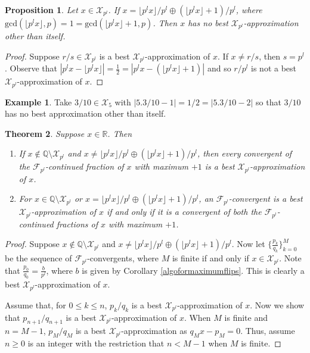 \documentclass[12pt]{elsarticle}
\newtheorem{theorem}{Theorem}[section]
\newtheorem{proposition}[theorem]{Proposition}
\theoremstyle{definition}
\newtheorem{example}{Example}
\newcommand{\field}[1]{\mathbb{#1}}          \newcommand{\Q}{\field{Q}}
\newcommand{\R}{\field{R}}                   \newcommand{\Z}{\field{Z}}
\newcommand{\mX}{{\mathcal X}}
\newcommand{\f}{{\mathcal F}}
\begin{document}
{  	\begin{proposition}\label{nobestappoffareysum}
  		Let $x\in\mX_{p^l}$. If $x=\lfloor p^lx\rfloor/p^l\oplus (\lfloor p^lx\rfloor+1)/p^l$, where $\mathrm{gcd}(\lfloor p^lx\rfloor,p)=1=\mathrm{gcd}(\lfloor p^lx\rfloor+1,p)$. Then $x$ has no best $\mX_{p^l}$-approximation other than itself.
  	\end{proposition}
  	\begin{proof}Suppose $r/s\in\mX_{p^l}$ is a best $\mX_{p^l}$-approximation of $x$. If $x\ne r/s$, then $s=p^l$. Observe that	$|p^lx-\lfloor p^lx\rfloor|=\frac{1}{2}=|p^lx-(\lfloor p^lx\rfloor+1)|$ and so $r/p^l$ is not a best $\mX_{p^l}$-approximation of $x.$	\end{proof}
  	\begin{example}
  		Take $3/10\in\mX_5$  with	$|5.3/10-1|=1/2=|5.3/10-2|$ so that $3/10$ has no best approximation other than itself.
  	\end{example}
  		\begin{theorem} Suppose $x\in\R$. Then
  			\begin{enumerate}
  				\item If $x\not\in\Q\setminus{\mX_{p^l}}$ and $x\ne\lfloor p^lx\rfloor/p^l\oplus (\lfloor p^lx\rfloor+1)/p^l$, then every convergent of the  $\f_{p^l}$-continued fraction of $x$ with maximum $+1$ is a best $\mX_{p^l}$-approximation of $x$.
  				
  				\item For $x\in\Q\setminus\mX_{p^l}$ or $x=\lfloor p^lx\rfloor/p^l\oplus (\lfloor p^lx\rfloor+1)/p^l$, an $\f_{p^l}$-convergent is a best $\mX_{p^l}$-approximation of $x$ if and only if it is a convergent of both  the  $\f_{p^l}$-continued fractions of $x$ with maximum $+1$.
  			\end{enumerate}
  		\end{theorem}
  		
  		
  		\begin{proof}			
  			Suppose $x\notin\Q\setminus \mX_{p^l}$ and $x\ne\lfloor p^lx\rfloor/p^l\oplus (\lfloor p^lx\rfloor+1)/p^l$.  Now let $\{\frac{p_k}{q_k}\}_{k=0}^M$ be the sequence of $\f_{p^l}$-convergents, where $M$ is finite if and only if $x\in\mX_{p^l}$.
  			Note that  $\frac{p_0}{q_0}=\frac{b}{p^l}$, where 	$b$ is given by Corollary \ref{algoformaximumflips}. This is clearly a best $\mX_{p^l}$-approximation of $x$.
  			
  		
  			Assume that, for $0 \le k \le n$, $p_{k}/q_{k}$  is a best $\mX_{p^l}$-approximation of $x$. Now we show that $p_{n+1}/q_{n+1}$ is a best $\mX_{p^l}$-approximation of $x$. When $M$ is finite and $n=M-1$, $p_M/q_M$ is a best $\mX_{p^l}$-approximation as $q_M x-p_M=0$. 	Thus, assume $n \geq 0$ is an integer with the restriction that $n<M-1$ when $M$ is finite.
  			

\end{proof}}
\end{document}
